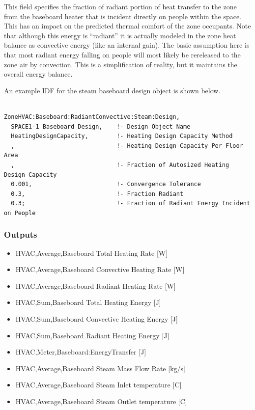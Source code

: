 This field specifies the fraction of radiant portion of heat transfer to the zone from the baseboard heater that is incident directly on people within the space. This has an impact on the predicted thermal comfort of the zone occupants. Note that although this energy is ``radiant'' it is actually modeled in the zone heat balance as convective energy (like an internal gain). The basic assumption here is that most radiant energy falling on people will most likely be rereleased to the zone air by convection. This is a simplification of reality, but it maintains the overall energy balance.

An example IDF for the steam baseboard design object is shown below.

\begin{lstlisting}

ZoneHVAC:Baseboard:RadiantConvective:Steam:Design,
  SPACE1-1 Baseboard Design,    !- Design Object Name
  HeatingDesignCapacity,        !- Heating Design Capacity Method
  ,                             !- Heating Design Capacity Per Floor Area
  ,                             !- Fraction of Autosized Heating Design Capacity
  0.001,                        !- Convergence Tolerance
  0.3,                          !- Fraction Radiant
  0.3;                          !- Fraction of Radiant Energy Incident on People
\end{lstlisting}

\subsubsection{Outputs}\label{outputs-1-021}

\begin{itemize}
\item
  HVAC,Average,Baseboard Total Heating Rate {[}W{]}
\item
  HVAC,Average,Baseboard Convective Heating Rate {[}W{]}
\item
  HVAC,Average,Baseboard Radiant Heating Rate {[}W{]}
\item
  HVAC,Sum,Baseboard Total Heating Energy {[}J{]}
\item
  HVAC,Sum,Baseboard Convective Heating Energy {[}J{]}
\item
  HVAC,Sum,Baseboard Radiant Heating Energy {[}J{]}
\item
  HVAC,Meter,Baseboard:EnergyTransfer {[}J{]}
\item
  HVAC,Average,Baseboard Steam Mass Flow Rate {[}kg/s{]}
\item
  HVAC,Average,Baseboard Steam Inlet temperature {[}C{]}
\item
  HVAC,Average,Baseboard Steam Outlet temperature {[}C{]}
\end{itemize}

